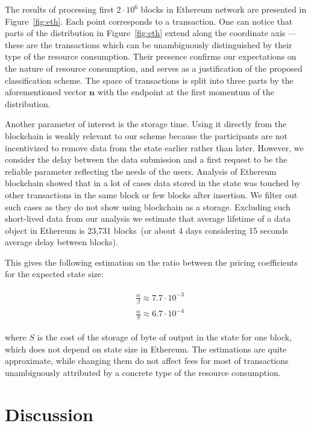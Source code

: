 \documentclass[]{llncs}   %
\newcommand{\authnote}[2]{\marginpar{\parbox{\marginparwidth}{\tiny %
  \textsf{#1 {\textcolor{blue}{notes: #2}}}}}%
  \textcolor{blue}{\textbf{\dag}}}
\newcommand{\authnote}[2]{
  \textsf{#1\textcolor{blue}{ #2}}}
\newcommand{\authnote}[2]{}
\newcommand{\dnote}[1]{{\authnote{\textcolor{red}{Dima notes:}}{#1}}}
\begin{document}
The results of processing first $2\cdot10^6$ blocks in Ethereum network are presented in Figure~\ref{fig:eth}. Each point corresponds to a transaction.
One can notice that parts of the distribution in Figure~\ref{fig:eth} extend
along the coordinate axis --- these are the transactions which can be
unambiguously distinguished by their type of the resource consumption. Their
presence confirms our expectations on the nature of resource consumption, and
serves as a justification of the proposed classification scheme. The space of
transactions is split into three parts by the aforementioned vector $\mathbf{n}$
with the endpoint at the first momentum of the distribution. \dnote{for transactions that are not on axises. How to write it?}

Another parameter of interest is the storage time. Using it directly
from the blockchain is weakly relevant to our scheme because the participants are not incentivized to remove data from the state earlier rather than later.
However, we consider the delay between the data submission and a first request to be the reliable parameter reflecting the needs of the users.
Analysis of Ethereum blockchain showed that in a lot of cases data stored in the state
was touched by other transactions in the same block or few blocks after insertion.
We filter out such cases as they do not show using blockchain as a storage. Excluding such short-lived data from our analysis
we estimate that average lifetime of a data object in Ethereum is 23,731 blocks~(or about 4 days
considering 15 seconds average delay between blocks).

This gives the following estimation on the ratio between the pricing coefficients for the expected state size:

\begin{align}
\begin{split}
&\frac{\alpha}{\beta} \approx 7.7\cdot10^{-3} \\
&\frac{\alpha}{S} \approx 6.7\cdot10^{-4}
\end{split}
\end{align}

where $S$ is the cost of the storage of byte of output in the state for one block, which does
not depend on state size in Ethereum. The estimations are quite approximate, while changing
them do not affect fees for most of transactions unambiguously attributed by a concrete type of the resource consumption.

\section{Discussion}
\label{sec:conslusion}
\end{document}
